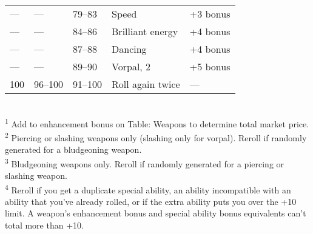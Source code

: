 \begin{table}[]
\begin{tabularx}{\linewidth}{lllXl}
--- & --- & 79--83 & Speed & +3 bonus\\
--- & --- & 84--86 & Brilliant energy & +4 bonus\\
--- & --- & 87--88 & Dancing & +4 bonus\\
--- & --- & 89--90 & Vorpal, 2 & +5 bonus\\
100 & 96--100 & 91--100 & Roll again twice & ---\\
\end{tabularx}\\
\textsuperscript{1} Add to enhancement bonus on Table: Weapons to determine total market price. \\
\textsuperscript{2} Piercing or slashing weapons only (slashing only for vorpal). Reroll if randomly generated for a bludgeoning weapon. \\
\textsuperscript{3} Bludgeoning weapons only. Reroll if randomly generated for a piercing or slashing weapon.\\
\textsuperscript{4} Reroll if you get a duplicate special ability, an ability incompatible with an ability that you've already rolled, or if the extra ability puts you over the +10 limit. A weapon's enhancement bonus and special ability bonus equivalents can't total more than +10.\\
\end{table}
		
